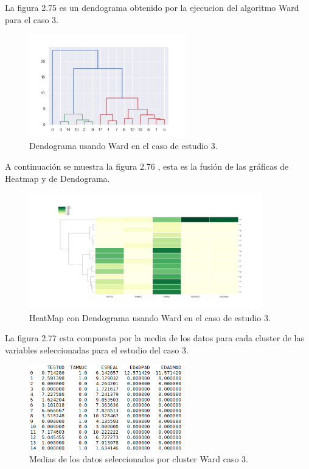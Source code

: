 
	La figura 2.75 es un dendograma obtenido por la ejecucion del algoritmo Ward para
	el caso 3. \\

	\begin{figure}[htb]
		\centering
		\includegraphics[width=0.6\textwidth]{./imagenes/caso3/dendograma_caso3_Ward}
		\caption{Dendograma usando Ward en el caso de estudio 3.} \label{fig:1}
	\end{figure}

	A continuación se muestra la figura 2.76 , esta es la fusión de las gráficas de 
	Heatmap y de Dendograma.  \\

	\begin{figure}[htb]
		\centering
		\includegraphics[width=0.9\textwidth]{./imagenes/caso3/heatmapcondendograma_caso3_Ward}
		\caption{HeatMap con Dendograma usando Ward en el caso de estudio 3.} \label{fig:1}
	\end{figure}

	La figura 2.77 esta compuesta por la media de los datos para cada cluster de las variables seleccionadas
	para el estudio del caso 3. \\ 

	\begin{figure}[htb]
		\centering
		\includegraphics[width=0.6\textwidth]{./imagenes/caso3/medias_datos_caso3_Ward}
		\caption{Medias de los datos seleccionados por cluster Ward caso 3.} \label{fig:1}
	\end{figure}

